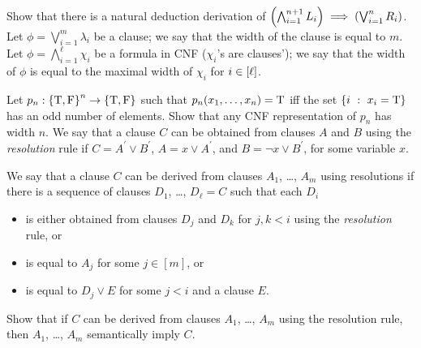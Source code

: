 \begin{chapterendexercises}
      Show that there is a natural deduction derivation of
      $\left(
          \bigwedge_{i = 1}^{n + 1} L_i
        \right)
        \implies
        \left(
          \bigvee_{i = 1}^{n} R_i
        \right)$.
    \exercise Let $\phi = \bigvee_{i = 1}^m \lambda_i$ be a clause; we say that
      the width of the clause is equal to $m$.
      Let $\phi = \bigwedge_{i = 1}^\ell \chi_i$ be a formula in CNF
      ($\chi_i$'s are clauses'); we say that the width of $\phi$ is equal to
      the maximal width of $\chi_i$ for $i \in [{\ell}]$.

      Let $p_n : \set{\ltrue, \lfalse}^n \to \set{\ltrue, \lfalse}$ such that
      $p_n(x_1, \dots, x_n) = \text{T}$
      iff the set $\set[x_i = \ltrue]{i}$ has an odd number of elements.
      Show that any CNF representation of $p_n$ has width $n$.
    \exercise We say that a clause $C$ can be obtained from clauses $A$ and $B$
      using the \emph{resolution} rule if $C = A^\prime \lor B^\prime$,
      $A = x \lor A^\prime$, and $B = \lnot x \lor B^\prime$, for some variable
      $x$.

      We say that a clause $C$ can be derived from clauses $A_1$, \dots, $A_m$
      using resolutions
      if there is a sequence of clauses $D_1$, \dots, $D_\ell = C$ such that
      each $D_i$
      \begin{itemize}
        \item is either obtained from clauses $D_j$ and $D_k$ for $j, k < i$ using the
          \emph{resolution} rule, or
        \item is equal to $A_j$ for some $j \in [m]$, or
        \item is equal to $D_j \lor E$ for some $j < i$ and a clause $E$.
      \end{itemize}

      Show that if $C$ can be derived from clauses $A_1$, \dots, $A_m$ using
      the resolution rule, then $A_1$, \dots, $A_m$ semantically imply $C$.
\end{chapterendexercises}
